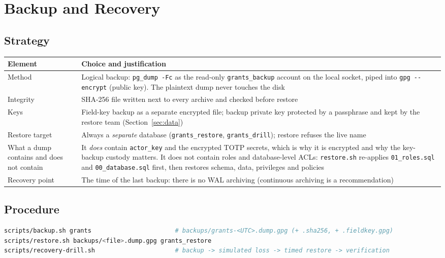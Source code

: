 \documentclass[10pt,a4paper]{article}
\newcommand{\code}[1]{\nolinkurl{#1}}
\newcommand{\tcap}[1]{\captionof{table}{#1}\nopagebreak[4]\vspace{-3pt}}
\begin{document}
\section{Backup and Recovery}\label{sec:backup}

\subsection{Strategy}
\tcap{Backup strategy}
\begin{center}\small
\begin{tabularx}{\linewidth}{@{}L{3.3cm}Y@{}}
\toprule\textbf{Element} & \textbf{Choice and justification}\\\midrule
Method & Logical backup: \code{pg_dump -Fc} as the read-only \code{grants_backup} account on the local socket, piped into \code{gpg --encrypt} (public key). The plaintext dump never touches the disk\\
Integrity & SHA-256 file written next to every archive and checked before restore\\
Keys & Field-key backup as a separate encrypted file; backup private key protected by a passphrase and kept by the restore team (Section~\ref{sec:data})\\
Restore target & Always a \emph{separate} database (\code{grants_restore}, \code{grants_drill}); restore refuses the live name\\
What a dump contains and does not contain & It \emph{does} contain \code{actor\_key} and the encrypted TOTP secrets, which is why it is encrypted and why the key-backup custody matters. It does not contain roles and database-level ACLs: \code{restore.sh} re-applies \code{01_roles.sql} and \code{00_database.sql} first, then restores schema, data, privileges and policies\\
Recovery point & The time of the last backup: there is no WAL archiving (continuous archiving is a recommendation)\\
\bottomrule\end{tabularx}\end{center}

\subsection{Procedure}
\begin{lstlisting}[language=bash]
scripts/backup.sh grants                       # backups/grants-<UTC>.dump.gpg (+ .sha256, + .fieldkey.gpg)
scripts/restore.sh backups/<file>.dump.gpg grants_restore
scripts/recovery-drill.sh                      # backup -> simulated loss -> timed restore -> verification
\end{lstlisting}
\end{document}
